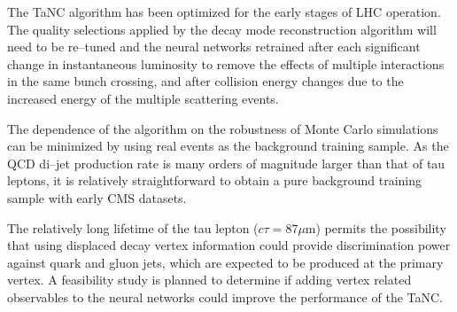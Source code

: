 The TaNC algorithm has been optimized for the early stages of LHC operation.
The quality selections applied by the decay mode reconstruction algorithm will
need to be re--tuned and the neural networks retrained after each significant
change in instantaneous luminosity to remove the effects of multiple
interactions in the same bunch crossing, and after collision energy changes due
to the increased energy of the multiple scattering events.  

The dependence of the algorithm on the robustness of Monte
Carlo simulations can be minimized by using real events as the background
training sample.  As the QCD di--jet production rate is many orders of magnitude
larger than that of tau leptons, it is relatively straightforward to obtain a
pure background training sample with early CMS datasets.

The relatively long lifetime of the tau lepton ($c\tau = 87\mu$m) permits the
possibility that using displaced decay vertex information could provide
discrimination power against quark and gluon jets, which are expected to be
produced at the primary vertex.  A feasibility study is planned to determine if
adding vertex related observables to the neural networks could improve the
performance of the TaNC.
